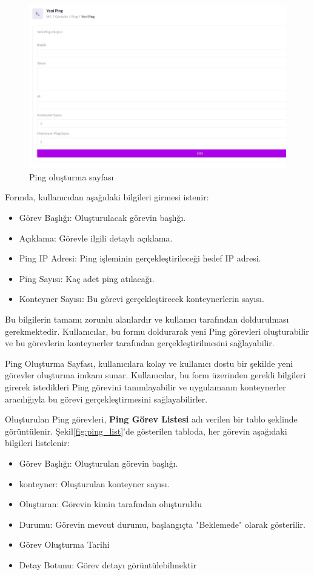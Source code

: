 \begin{figure}[ht]
	\centering
	\includegraphics[width=0.9\linewidth]{images/create.jpeg}
	\caption{Ping oluşturma sayfası}
	\label{fig:create}
\end{figure}

Formda, kullanıcıdan aşağıdaki bilgileri girmesi istenir:
\begin{itemize}
	\item Görev Başlığı: Oluşturulacak görevin başlığı.
	\item Açıklama: Görevle ilgili detaylı açıklama.
	\item Ping IP Adresi: Ping işleminin gerçekleştirileceği hedef IP adresi.
	\item Ping Sayısı: Kaç adet ping atılacağı.
	\item Konteyner Sayısı: Bu görevi gerçekleştirecek konteynerlerin sayısı.
\end{itemize}

Bu bilgilerin tamamı zorunlu alanlardır ve kullanıcı tarafından doldurulması gerekmektedir. Kullanıcılar, bu formu doldurarak yeni Ping görevleri oluşturabilir ve bu görevlerin konteynerler tarafından gerçekleştirilmesini sağlayabilir.

Ping Oluşturma Sayfası, kullanıcılara kolay ve kullanıcı dostu bir şekilde yeni görevler oluşturma imkanı sunar. Kullanıcılar, bu form üzerinden gerekli bilgileri girerek istedikleri Ping görevini tanımlayabilir ve uygulamanın konteynerler aracılığıyla bu görevi gerçekleştirmesini sağlayabilirler.

Oluşturulan Ping görevleri, \textbf{Ping Görev Listesi} adı verilen bir tablo şeklinde görüntülenir. Şekil\ref{fig:ping_list}'de gösterilen tabloda, her görevin aşağıdaki bilgileri listelenir:

\begin{itemize}
	\item Görev Başlığı: Oluşturulan görevin başlığı.
	\item konteyner: Oluşturulan konteyner sayısı.
	\item Oluşturan: Görevin kimin tarafından oluşturuldu
	\item Durumu: Görevin mevcut durumu, başlangıçta "Beklemede" olarak gösterilir.
	\item Görev Oluşturma Tarihi
	\item Detay Botunu: Görev detayı görüntülebilmektir
\end{itemize}

